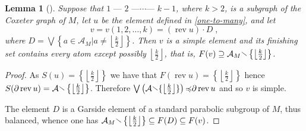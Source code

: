 \documentclass[a4paper,final]{article}
\theoremstyle{plain}
\newtheorem{lemma}[lemma]{Lemma}
\theoremstyle{remark}
\theoremstyle{definition}
\begin{document}
\begin{lemma}[\cite{Caruso13}]\label{rev-u}
  Suppose that $1 \text{ --- } 2 \text{ ---} \cdots \text{--- } k-1$, where $k>2$, is
  a subgraph of the Coxeter graph of $M$, let $u$ be the element defined in \autoref{one-to-many},
  and let 
  \[ 
  v = v(1,2,\ldots,k) = (\operatorname{rev} u) \cdot D
  \;,
  \]
  where $D = {\bigvee} \left\{ a \in {\mathcal{A}}_M {\boldsymbol{\mid}} a \ne \left\lfloor\tfrac{k}{2}\right\rfloor\right\}$.
  Then $v$ is a simple element and its finishing set
  contains every atom except possibly $\left\lfloor\frac{k}{2}\right\rfloor$,
  that is, ${F}(v) \supseteq {\mathcal{A}}_M {\mathbin{\raisebox{0.25ex}{$\smallsetminus$}}}
  \left\{\left\lfloor\frac{k}{2}\right\rfloor\right\}$.
\end{lemma}
\begin{proof}
  As ${S}(u) = \left\{\left\lfloor\frac{k}{2}\right\rfloor\right\}$
  we have that ${F}(\operatorname{rev} u) =
  \left\{\left\lfloor\frac{k}{2}\right\rfloor\right\}$ hence
  ${S}({\partial}\operatorname{rev} u) =
  {\mathcal{A}}{\mathbin{\raisebox{0.25ex}{$\smallsetminus$}}}\left\{\left\lfloor\frac{k}{2}\right\rfloor\right\}$.  Therefore
  ${\bigvee}\left({\mathcal{A}}{\mathbin{\raisebox{0.25ex}{$\smallsetminus$}}}\{\left\lfloor\frac{k}{2}\right\rfloor\}\right)
  {\preccurlyeq} {\partial}\operatorname{rev} u$ and so $v$ is simple.

  The element $D$ is a Garside element of a standard parabolic subgroup of $M$, thus balanced, whence one has
  ${\mathcal{A}}_M {\mathbin{\raisebox{0.25ex}{$\smallsetminus$}}} \left\{\left\lfloor\frac{k}{2}\right\rfloor\right\} \subseteq {F}(D) \subseteq {F}(v)$.
\end{proof}
\end{document}
